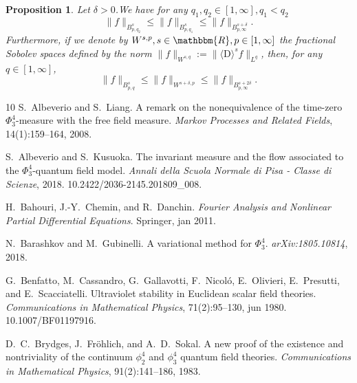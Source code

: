 \documentclass[11pt]{article}
\newcommand{\assign}{:=}
\newcommand{\mathD}{\mathrm{D}}
\newcommand{\tmtextit}[1]{{\itshape{#1}}}
\newtheorem{proposition}{Proposition}
{\theorembodyfont{\rmfamily}\newtheorem{remark}{Remark}}
\begin{document}
\begin{proposition}
  \label{besovembedding2}Let $\delta > 0$.We have for any $q_1, q_2 \in [1,
  \infty], q_1 < q_2$
  \[ \| f \|_{B_{p, q_2}^s} \leqslant \| f \|_{B_{p, q_1}^s} \leqslant \| f
     \|_{B_{p, \infty}^{s + \delta}} . \]
  Furthermore, if we denote by $W^{s, p}, s \in \mathbbm{R}, p \in [1,
  \infty]$ the fractional Sobolev spaces defined by the norm $\| f \|_{W^{s,
  q}} \assign \| \langle \mathD \rangle^s f \|_{L^q}$, then, for any $q \in
  [1, \infty]$,
  \[ \| f \|_{B_{p, q}^s} \leqslant \| f \|_{W^{s + \delta, p}} \leqslant \| f
     \|_{B_{p, \infty}^{s + 2 \delta}} . \]
\end{proposition}

\begin{thebibliography}{10}
  S.~Albeverio  and  S.~Liang. {\newblock}A
  remark on the nonequivalence of the time-zero $\Phi^4_3$-measure with the
  free field measure. {\newblock}\tmtextit{Markov Processes and Related
  Fields}, 14(1):159--164, 2008.{\newblock}
  
  S.~Albeverio  and  S.~Kusuoka.
  {\newblock}The invariant measure and the flow associated to the
  $\Phi^4_3$-quantum field model. {\newblock}\tmtextit{Annali della Scuola
  Normale di Pisa - Classe di Scienze}, 2018.
  {\newblock}\href{Https://doi.org/10.2422/2036-2145.201809_008}{}10.2422/2036-2145.201809\_008.{\newblock}
  
  H.~Bahouri, J.-Y.~Chemin, and  R.~Danchin.
  {\newblock}\tmtextit{Fourier Analysis and Nonlinear Partial Differential
  Equations}. {\newblock}Springer, jan 2011.{\newblock}
  
  N.~Barashkov  and  M.~Gubinelli.
  {\newblock}A variational method for $\Phi^4_3$.
  {\newblock}\tmtextit{\href{Http://arxiv.org/abs/1805.10814}{}arXiv:1805.10814},
  2018.{\newblock}
  
  G.~Benfatto, M.~Cassandro,
  G.~Gallavotti, F.~Nicol{\'o}, E.~Olivieri, E.~Presutti, and 
  E.~Scacciatelli. {\newblock}Ultraviolet stability in Euclidean scalar field
  theories. {\newblock}\tmtextit{Communications in Mathematical Physics},
  71(2):95--130, jun 1980.
  {\newblock}\href{Https://doi.org/10.1007/BF01197916}{}10.1007/BF01197916.{\newblock}
  
  D.~C.~Brydges, J.~Fr{\"o}hlich, and 
  A.~D.~Sokal. {\newblock}A new proof of the existence and nontriviality of
  the continuum $\phi^4_2$ and $\phi^4_3$ quantum field theories.
  {\newblock}\tmtextit{Communications in Mathematical Physics},
  91(2):141--186, 1983.{\newblock}
  

\end{thebibliography}
\end{document}

